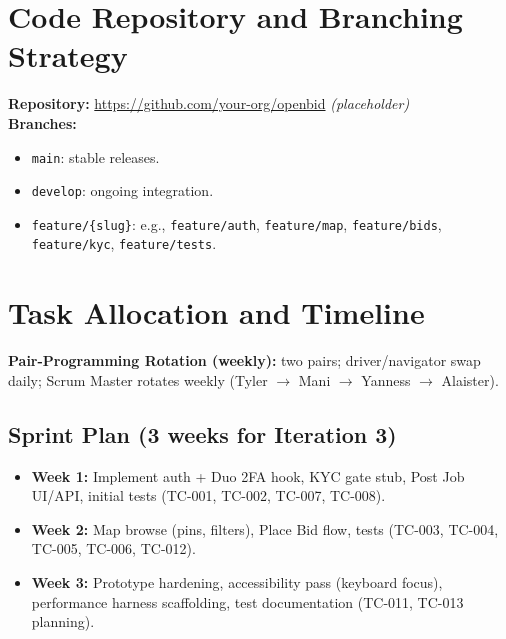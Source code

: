 \documentclass[11pt]{article}
\begin{document}
\section{Code Repository and Branching Strategy}
\textbf{Repository:} \url{https://github.com/your-org/openbid} \textit{(placeholder)} \\[4pt]
\textbf{Branches:}
\begin{itemize}[leftmargin=1.4em]
  \item \texttt{main}: stable releases.
  \item \texttt{develop}: ongoing integration.
  \item \texttt{feature/\{slug\}}: e.g., \texttt{feature/auth}, \texttt{feature/map}, \texttt{feature/bids}, \texttt{feature/kyc}, \texttt{feature/tests}.
\end{itemize}

\section{Task Allocation and Timeline}
\textbf{Pair-Programming Rotation (weekly):} two pairs; driver/navigator swap daily; Scrum Master rotates weekly (Tyler \(\rightarrow\) Mani \(\rightarrow\) Yanness \(\rightarrow\) Alaister).

\subsection*{Sprint Plan (3 weeks for Iteration 3)}
\begin{itemize}[leftmargin=1.4em]
  \item \textbf{Week 1:} Implement auth + Duo 2FA hook, KYC gate stub, Post Job UI/API, initial tests (TC-001, TC-002, TC-007, TC-008).
  \item \textbf{Week 2:} Map browse (pins, filters), Place Bid flow, tests (TC-003, TC-004, TC-005, TC-006, TC-012).
  \item \textbf{Week 3:} Prototype hardening, accessibility pass (keyboard focus), performance harness scaffolding, test documentation (TC-011, TC-013 planning).
\end{itemize}
\end{document}
